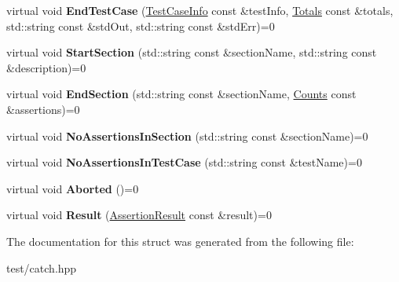 \begin{DoxyCompactItemize}
\item 
virtual void {\bfseries End\+Test\+Case} (\hyperlink{structCatch_1_1TestCaseInfo}{Test\+Case\+Info} const \&test\+Info, \hyperlink{structCatch_1_1Totals}{Totals} const \&totals, std\+::string const \&std\+Out, std\+::string const \&std\+Err)=0\hypertarget{structCatch_1_1IReporter_a3da1e768e205533165e2fda4af7e0f4f}{}\label{structCatch_1_1IReporter_a3da1e768e205533165e2fda4af7e0f4f}

\item 
virtual void {\bfseries Start\+Section} (std\+::string const \&section\+Name, std\+::string const \&description)=0\hypertarget{structCatch_1_1IReporter_a8fc7f21b3d03083f1633431f47534404}{}\label{structCatch_1_1IReporter_a8fc7f21b3d03083f1633431f47534404}

\item 
virtual void {\bfseries End\+Section} (std\+::string const \&section\+Name, \hyperlink{structCatch_1_1Counts}{Counts} const \&assertions)=0\hypertarget{structCatch_1_1IReporter_a1bc1fd4b6cd5431a3a8c943c9c4d8d57}{}\label{structCatch_1_1IReporter_a1bc1fd4b6cd5431a3a8c943c9c4d8d57}

\item 
virtual void {\bfseries No\+Assertions\+In\+Section} (std\+::string const \&section\+Name)=0\hypertarget{structCatch_1_1IReporter_ad382266a8a98628e5c199c6961734a9e}{}\label{structCatch_1_1IReporter_ad382266a8a98628e5c199c6961734a9e}

\item 
virtual void {\bfseries No\+Assertions\+In\+Test\+Case} (std\+::string const \&test\+Name)=0\hypertarget{structCatch_1_1IReporter_afe624f1c1c221703d1bdbf12d2cc058f}{}\label{structCatch_1_1IReporter_afe624f1c1c221703d1bdbf12d2cc058f}

\item 
virtual void {\bfseries Aborted} ()=0\hypertarget{structCatch_1_1IReporter_a00d9d8bedcf32e5fdeed12b620b7ff7e}{}\label{structCatch_1_1IReporter_a00d9d8bedcf32e5fdeed12b620b7ff7e}

\item 
virtual void {\bfseries Result} (\hyperlink{classCatch_1_1AssertionResult}{Assertion\+Result} const \&result)=0\hypertarget{structCatch_1_1IReporter_aff9de693fee3a041d022894453140c5a}{}\label{structCatch_1_1IReporter_aff9de693fee3a041d022894453140c5a}

\end{DoxyCompactItemize}


The documentation for this struct was generated from the following file\+:\begin{DoxyCompactItemize}
\item 
test/catch.\+hpp\end{DoxyCompactItemize}
